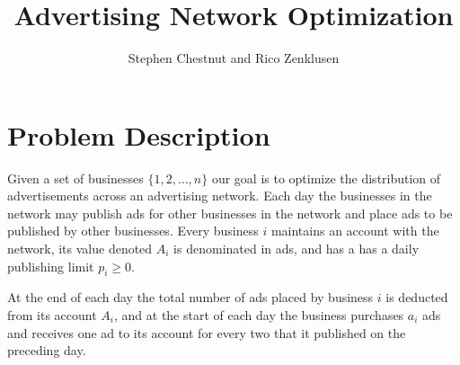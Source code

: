 \documentclass[letterpaper,10pt]{article}
\begin{document}




\title{Advertising Network Optimization}
\author{Stephen Chestnut and Rico Zenklusen}

\maketitle
\section{Problem Description}

Given a set of businesses $\{1,2,\ldots,n\}$ our goal is to optimize the distribution of advertisements across an advertising network.  Each day the businesses in the network may publish ads for other businesses in the network and place ads to be published by other businesses.  Every business $i$ maintains an account with the network, its value denoted $A_i$ is denominated in ads, and has a has a daily publishing limit $p_i\geq0$.

At the end of each day the total number of ads placed by business $i$ is deducted from its account $A_i$, and at the start of each day the business purchases $a_i$ ads and receives one ad to its account for every two that it published on the preceding day.  
\end{document}
